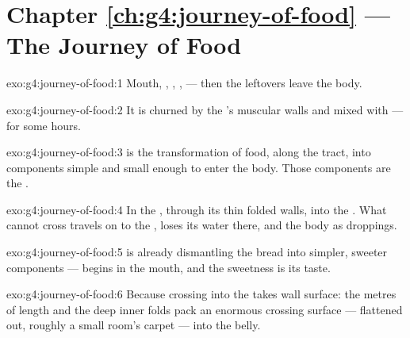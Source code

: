 \section*{Chapter \ref{ch:g4:journey-of-food} --- The Journey of Food}

\begin{solution}{exo:g4:journey-of-food:1}
Mouth, , , ,  ---
then the leftovers leave the body.
\end{solution}

\begin{solution}{exo:g4:journey-of-food:2}
It is churned by the 's muscular walls and mixed with
 --- for some hours.
\end{solution}

\begin{solution}{exo:g4:journey-of-food:3}
 is the transformation of food, along the tract, into
components simple and small enough to enter the body. Those
components are the .
\end{solution}

\begin{solution}{exo:g4:journey-of-food:4}
In the , through its thin folded walls, into the
. What cannot cross travels on to the ,
loses its water there, and  the body as droppings.
\end{solution}

\begin{solution}{exo:g4:journey-of-food:5}
 is already dismantling the bread into simpler, sweeter
components ---  begins in the mouth, and the sweetness
is its taste.
\end{solution}

\begin{solution}{exo:g4:journey-of-food:6}
Because crossing into the  takes wall surface: the metres
of length and the deep inner folds pack an enormous crossing
surface --- flattened out, roughly a small room's carpet ---
into the belly.
\end{solution}

